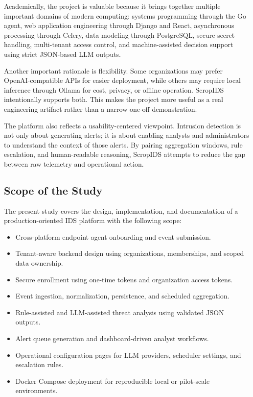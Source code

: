 \documentclass[12pt,a4paper]{article}
\begin{document}
Academically, the project is valuable because it brings together multiple important domains of modern computing: systems programming through the Go agent, web application engineering through Django and React, asynchronous processing through Celery, data modeling through PostgreSQL, secure secret handling, multi-tenant access control, and machine-assisted decision support using strict JSON-based LLM outputs.

Another important rationale is flexibility. Some organizations may prefer OpenAI-compatible APIs for easier deployment, while others may require local inference through Ollama for cost, privacy, or offline operation. ScropIDS intentionally supports both. This makes the project more useful as a real engineering artifact rather than a narrow one-off demonstration.

The platform also reflects a usability-centered viewpoint. Intrusion detection is not only about generating alerts; it is about enabling analysts and administrators to understand the context of those alerts. By pairing aggregation windows, rule escalation, and human-readable reasoning, ScropIDS attempts to reduce the gap between raw telemetry and operational action.

\subsection{Scope of the Study}
The present study covers the design, implementation, and documentation of a production-oriented IDS platform with the following scope:

\begin{itemize}
    \item Cross-platform endpoint agent onboarding and event submission.
    \item Tenant-aware backend design using organizations, memberships, and scoped data ownership.
    \item Secure enrollment using one-time tokens and organization access tokens.
    \item Event ingestion, normalization, persistence, and scheduled aggregation.
    \item Rule-assisted and LLM-assisted threat analysis using validated JSON outputs.
    \item Alert queue generation and dashboard-driven analyst workflows.
    \item Operational configuration pages for LLM providers, scheduler settings, and escalation rules.
    \item Docker Compose deployment for reproducible local or pilot-scale environments.
\end{itemize}
\end{document}
